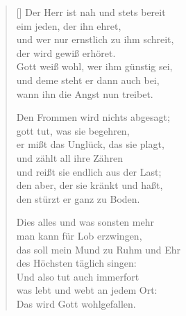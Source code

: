 \begin{multicols}{2}
\begin{verse}[\versewidth]
 Der Herr ist nah und stets bereit\\
eim jeden, der ihn ehret,\\
und wer nur ernstlich zu ihm schreit,\\
der wird gewiß erhöret.\\
Gott weiß wohl, wer ihm günstig sei,\\
und deme steht er dann auch bei,\\
wann ihn die Angst nun treibet.

 Den Frommen wird nichts abgesagt;\\
gott tut, was sie begehren,\\
er mißt das Unglück, das sie plagt,\\
und zählt all ihre Zähren\\
und reißt sie endlich aus der Last;\\
den aber, der sie kränkt und haßt,\\
den stürzt er ganz zu Boden.

 Dies alles und was sonsten mehr\\
man kann für Lob erzwingen,\\
das soll mein Mund zu Ruhm und Ehr\\
des Höchsten täglich singen:\\
Und also tut auch immerfort\\
was lebt und webt an jedem Ort:\\
Das wird Gott wohlgefallen.

\end{verse}
\end{multicols}
